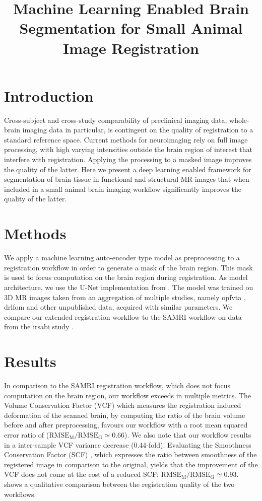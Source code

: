 \documentclass[11pt, english]{article}
\title{Machine Learning Enabled Brain Segmentation for Small Animal Image Registration}
\date{}
\begin{document}
    \maketitle


    \section{Introduction}
    Cross-subject and cross-study comparability of preclinical imaging data, whole-brain imaging data in particular, is
    contingent on the quality of registration to a standard reference space.
    Current methods for neuroimaging rely on full image processing, with high varying intensities outside the brain
    region of interest that interfere with registration.
    Applying the processing to a masked image improves the quality of the latter.
    Here we present a deep learning enabled framework for segmentation of brain tissue in functional and structural MR
    images that when included in a small animal brain imaging workflow significantly improves the quality of the latter.


    \section{Methods}
    We apply a machine learning auto-encoder type model as preprocessing to a registration workflow in order to
    generate a mask of the brain region.
    This mask is used to focus computation on the brain region during registration.
    As model architecture, we use the U-Net \citep{ronneberger_u-net:_2015} implementation from
    \citet{oktay_ozan-oktayattention-gated-networks_2020}.
    The model was trained on 3D MR images taken from an aggregation of multiple studies, namely opfvta
    \citep{ioanas_whole-brain_nodate}, drlfom \citep{imperfect_datasets} and other unpublished data, acquired with
    similar parameters.
    We compare our extended registration workflow to the SAMRI workflow \citep{samri} on data from the irsabi study
    \citep{irsabi_bidsdata}.


    \section{Results}
    In comparison to the SAMRI registration workflow, which does not focus computation on the brain region, our workflow
    exceeds in multiple metrics.
    The Volume Conservation Factor (VCF) \citep{ioanas_optimized_2019} which measures the registration induced
    deformation of the scanned brain, by computing the ratio of the brain volume before and after preprocessing, favours
    our workflow with a root mean squared error ratio of ($\mathrm{RMSE_{M}/RMSE_{G}\simeq} 0.66$).
    We also note that our workflow results in a inter-sample VCF variance decrease (0.44-fold).
    Evaluating the Smoothness Conservation Factor (SCF) \citep{ioanas_optimized_2019}, which expresses the ratio between
    smoothness of the registered image in comparison to the original, yields that the improvement of the VCF does not
    come at the cost of a reduced SCF: $\mathrm{RMSE_{M}/RMSE_{G}\simeq} 0.93$.
     shows a qualitative comparison between the registration quality of the two workflows.
\end{document}
